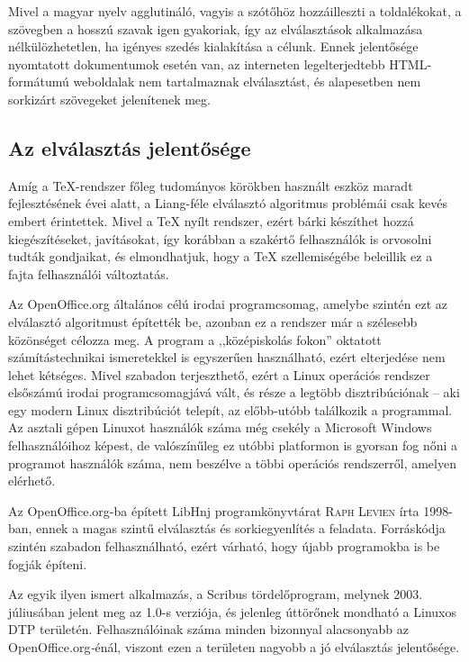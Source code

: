 \documentclass[12pt]{article}
\begin{document}
Mivel a magyar nyelv agglutináló, vagyis a szótőhöz hozzáilleszti
a toldalékokat, a szövegben a hosszú szavak igen gyakoriak, így az
elválasztások alkalmazása nélkülözhetetlen, ha igényes szedés kialakítása
a célunk. Ennek jelentősége nyomtatott dokumentumok esetén van, az
interneten legelterjedtebb HTML-formátumú weboldalak nem tartalmaznak
elválasztást, és alapesetben nem sorkizárt szövegeket jelenítenek
meg.


\subsection{Az elválasztás jelentősége}

Amíg a \TeX{}-rendszer főleg tudományos körökben használt eszköz maradt
fejlesztésének évei alatt, a Liang-féle elválasztó algoritmus problémái
csak kevés embert érintettek. Mivel a \TeX{} nyílt rendszer, ezért
bárki készíthet hozzá kiegészítéseket, javításokat, így korábban a
szakértő felhasználók is orvosolni tudták gondjaikat, és elmondhatjuk,
hogy a \TeX{} szellemiségébe beleillik ez a fajta felhasználói változtatás.

Az OpenOffice.org általános célú irodai programcsomag, amelybe szintén
ezt az elválasztó algoritmust építették be, azonban ez a rendszer
már a szélesebb közönséget célozza meg. A program a ,,középiskolás
fokon'' oktatott számítástechnikai ismeretekkel is egyszerűen használható,
ezért elterjedése nem lehet kétséges. Mivel szabadon terjeszthető,
ezért a Linux operációs rendszer elsőszámú irodai programcsomagjává
vált, és része a legtöbb disztribúciónak -- aki egy modern Linux disztribúciót
telepít, az előbb-utóbb találkozik a programmal. Az asztali gépen
Linuxot használók száma még csekély a Microsoft Windows felhasználóihoz
képest, de valószínűleg ez utóbbi platformon is gyorsan fog nőni a
programot használók száma, nem beszélve a többi operációs rendszerről,
amelyen elérhető.

Az OpenOffice.org-ba épített LibHnj programkönyvtárat \textsc{Raph
Levien} írta 1998-ban, ennek a magas szintű elválasztás és sorkiegyenlítés
a feladata. Forráskódja szintén szabadon felhasználható, ezért várható,
hogy újabb programokba is be fogják építeni.

Az egyik ilyen ismert alkalmazás, a Scribus tördelőprogram, melynek
2003. júliusában jelent meg az 1.0-s verziója, és jelenleg úttörőnek
mondható a Linuxos DTP területén. Felhasználóinak száma minden bizonnyal
alacsonyabb az OpenOffice.org\emph{-}énál, viszont ezen a területen
nagyobb a jó elválasztás jelentősége.
\end{document}
